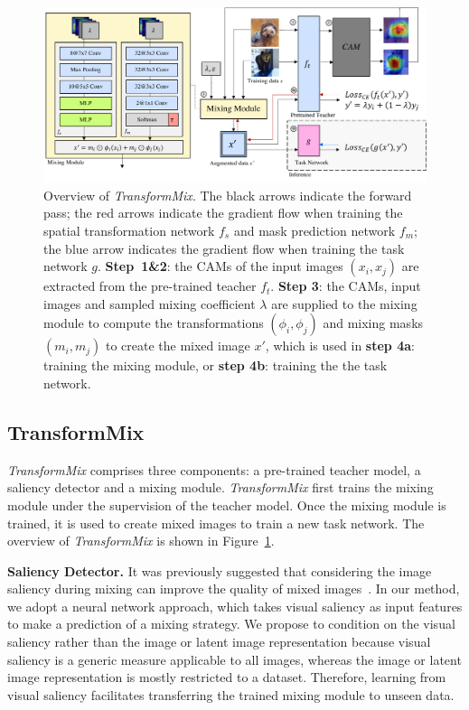 \documentclass[10pt]{article} %
\newcommand{\TMIX}[0]{\textit{TransformMix }}
\newcommand{\TMIXb}[0]{\textit{TransformMix}}
\begin{document}
\begin{figure}[t]
\centering
\includegraphics[width=\textwidth]{./img/method.pdf}
\caption{Overview of \TMIXb. The black arrows indicate the forward pass; the red arrows indicate the gradient flow when training the spatial transformation network $f_s$ and mask prediction network $f_m$; the blue arrow indicates the gradient flow when training the task network $g$. \textbf{Step~1\&2}: the CAMs of the input images $(x_i, x_j)$ are extracted from the pre-trained teacher $f_t$. \textbf{Step 3}: the CAMs, input images and sampled mixing coefficient $\lambda$ are supplied to the mixing module to compute the transformations $(\phi_i, \phi_j)$ and mixing masks $(m_i, m_j)$  to create the mixed image $x'$, which is used in \textbf{step 4a}: training the mixing module, or \textbf{step 4b}: training the the task network.}
\label{fig:method}
\end{figure}

\subsection{TransformMix}
\noindent \TMIX comprises three components: a pre-trained teacher model, a saliency detector and a mixing module. \TMIX first trains the mixing module under the supervision of the teacher model. Once the mixing module is trained, it is used to create mixed images to train a new task network. The overview of \TMIX is shown in Figure~\ref{fig:method}.

\textbf{Saliency Detector.}
It was previously suggested that considering the image saliency during mixing can improve the quality of mixed images~\citep{puzzlemix,smix}. In our method, we adopt a neural network approach, which takes visual saliency as input features to make a prediction of a mixing strategy. We propose to condition on the visual saliency rather than the image or latent image representation because visual saliency is a generic measure applicable to all images, whereas the image or latent image representation is mostly restricted to a dataset. Therefore, learning from visual saliency facilitates transferring the trained mixing module to unseen data. 
\end{document}
